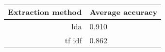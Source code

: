 \begin{tabular}{|r|l|}
  \hline
  Extraction method & Average accuracy \\ 
  \hline
  lda & 0.910 \\ 
  \hline
  tf idf & 0.862 \\ 
  \hline
\end{tabular}
